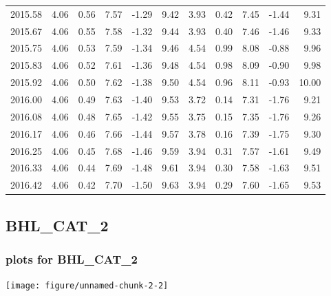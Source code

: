 \documentclass[10pt,a4paper]{article}\usepackage[]{graphicx}\usepackage[]{color}
\makeatletter
\def\maxwidth{ %
  \ifdim\Gin@nat@width>\linewidth
    \linewidth
  \else
    \Gin@nat@width
  \fi
}
\newcommand{\AaA}{\_}
\makeatother
\begin{document}
\begin{table}[ht]
\begin{tabular}{rrrrrrrrrrr}
  2015.58 & 4.06 & 0.56 & 7.57 & -1.29 & 9.42 & 3.93 & 0.42 & 7.45 & -1.44 & 9.31 \\ 
  2015.67 & 4.06 & 0.55 & 7.58 & -1.32 & 9.44 & 3.93 & 0.40 & 7.46 & -1.46 & 9.33 \\ 
  2015.75 & 4.06 & 0.53 & 7.59 & -1.34 & 9.46 & 4.54 & 0.99 & 8.08 & -0.88 & 9.96 \\ 
  2015.83 & 4.06 & 0.52 & 7.61 & -1.36 & 9.48 & 4.54 & 0.98 & 8.09 & -0.90 & 9.98 \\ 
  2015.92 & 4.06 & 0.50 & 7.62 & -1.38 & 9.50 & 4.54 & 0.96 & 8.11 & -0.93 & 10.00 \\ 
  2016.00 & 4.06 & 0.49 & 7.63 & -1.40 & 9.53 & 3.72 & 0.14 & 7.31 & -1.76 & 9.21 \\ 
  2016.08 & 4.06 & 0.48 & 7.65 & -1.42 & 9.55 & 3.75 & 0.15 & 7.35 & -1.76 & 9.26 \\ 
  2016.17 & 4.06 & 0.46 & 7.66 & -1.44 & 9.57 & 3.78 & 0.16 & 7.39 & -1.75 & 9.30 \\ 
  2016.25 & 4.06 & 0.45 & 7.68 & -1.46 & 9.59 & 3.94 & 0.31 & 7.57 & -1.61 & 9.49 \\ 
  2016.33 & 4.06 & 0.44 & 7.69 & -1.48 & 9.61 & 3.94 & 0.30 & 7.58 & -1.63 & 9.51 \\ 
  2016.42 & 4.06 & 0.42 & 7.70 & -1.50 & 9.63 & 3.94 & 0.29 & 7.60 & -1.65 & 9.53 \\ 
   \hline
\end{tabular}
\end{table}

\newpage
\subsection{BHL\AaA CAT\AaA 2}
\subsubsection{plots for BHL\AaA CAT\AaA 2}

\texttt{[image: figure/unnamed-chunk-2-2]} 

\newpage
\end{document}
